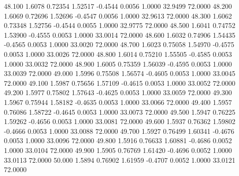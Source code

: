   48.100   1.6078   0.72354   1.52517  -0.4544   0.0056   1.0000  32.9499  72.0000
  48.200   1.6069   0.72696   1.52696  -0.4547   0.0056   1.0000  32.9613  72.0000
  48.300   1.6062   0.73348   1.52756  -0.4544   0.0055   1.0000  32.9775  72.0000
  48.500   1.6041   0.74752   1.53900  -0.4555   0.0053   1.0000  33.0014  72.0000
  48.600   1.6032   0.74906   1.54435  -0.4565   0.0053   1.0000  33.0020  72.0000
  48.700   1.6023   0.75058   1.54970  -0.4575   0.0053   1.0000  33.0026  72.0000
  48.800   1.6014   0.75210   1.55505  -0.4585   0.0053   1.0000  33.0032  72.0000
  48.900   1.6005   0.75359   1.56039  -0.4595   0.0053   1.0000  33.0039  72.0000
  49.000   1.5996   0.75508   1.56574  -0.4605   0.0053   1.0000  33.0045  72.0000
  49.100   1.5987   0.75656   1.57109  -0.4615   0.0053   1.0000  33.0052  72.0000
  49.200   1.5977   0.75802   1.57643  -0.4625   0.0053   1.0000  33.0059  72.0000
  49.300   1.5967   0.75944   1.58182  -0.4635   0.0053   1.0000  33.0066  72.0000
  49.400   1.5957   0.76086   1.58722  -0.4645   0.0053   1.0000  33.0073  72.0000
  49.500   1.5947   0.76225   1.59262  -0.4656   0.0053   1.0000  33.0081  72.0000
  49.600   1.5937   0.76362   1.59802  -0.4666   0.0053   1.0000  33.0088  72.0000
  49.700   1.5927   0.76499   1.60341  -0.4676   0.0053   1.0000  33.0096  72.0000
  49.800   1.5916   0.76633   1.60881  -0.4686   0.0052   1.0000  33.0104  72.0000
  49.900   1.5905   0.76769   1.61420  -0.4696   0.0052   1.0000  33.0113  72.0000
  50.000   1.5894   0.76902   1.61959  -0.4707   0.0052   1.0000  33.0121  72.0000

